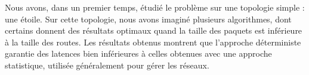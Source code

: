 \documentclass[a4paper,titlepage,12pt,normalheadings,makeidx]{article}
\begin{document}
Nous avons, dans un premier temps, étudié le problème sur une topologie simple : une étoile. Sur cette topologie, nous avons imaginé plusieurs algorithmes, dont certains donnent des résultats optimaux quand la taille des paquets est inférieure à la taille des routes. Les résultats obtenus montrent que l'approche déterministe garantie des latences bien inférieures à celles obtenues avec une approche statistique, utilisée généralement pour gérer les réseaux.

\vfill
\end{document}

